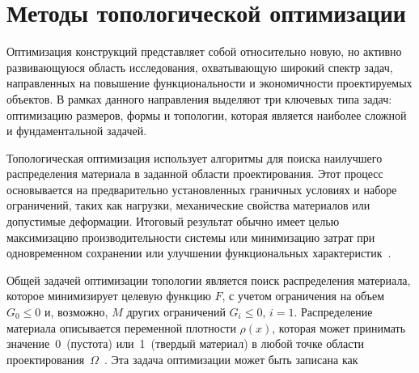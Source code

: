 \section{Методы топологической оптимизации}\label{sec:ch1/sec2}

Оптимизация конструкций представляет собой относительно новую, но активно развивающуюся область исследования, охватывающую широкий спектр задач, направленных на повышение функциональности и экономичности проектируемых объектов. В рамках данного направления выделяют три ключевых типа задач: оптимизацию размеров, формы и топологии, которая является наиболее сложной и фундаментальной задачей.


Топологическая оптимизация использует алгоритмы для поиска наилучшего распределения материала в заданной области проектирования. 
Этот процесс основывается на предварительно установленных граничных условиях и наборе ограничений, таких как нагрузки, механические свойства материалов или допустимые деформации. 
Итоговый результат обычно имеет целью максимизацию производительности системы или минимизацию затрат при одновременном сохранении или улучшении функциональных характеристик~\cite{Bendsoe2003}. 

Общей задачей оптимизации топологии является поиск распределения материала, которое минимизирует целевую функцию $F$, с учетом ограничения на объем $G_0 \leqslant 0$ и, возможно, $M$ других ограничений $G_i \leq 0$, $i=1$.
Распределение материала описывается переменной плотности $\rho(x)$, которая может принимать значение~0~(пустота) или~1~(твердый материал) в любой точке области проектирования~$\Omega$~\cite{Sigmund2013}. Эта задача оптимизации может быть записана как

